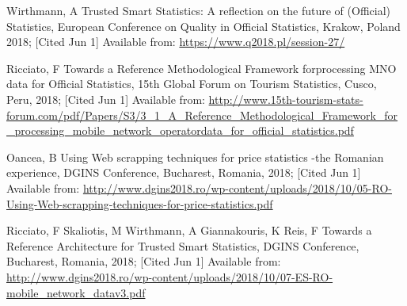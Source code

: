 \documentclass[]{article}
\begin{document}
\begin{thebibliography}{99}
Wirthmann, A Trusted Smart Statistics: A reflection on the future of (Official) Statistics, European Conference on Quality in Official Statistics, Krakow, Poland 2018; [Cited Jun 1]
Available from:
\url{https://www.q2018.pl/session-27/}

Ricciato, F Towards a Reference Methodological Framework forprocessing MNO data for Official Statistics, 15th Global Forum on Tourism Statistics, Cusco, Peru, 2018; [Cited Jun 1]
Available from:
\url{http://www.15th-tourism-stats-forum.com/pdf/Papers/S3/3_1_A_Reference_Methodological_Framework_for_processing_mobile_network_operatordata_for_official_statistics.pdf}

Oancea, B Using Web scrapping techniques for price statistics -the Romanian experience, DGINS Conference, Bucharest, Romania, 2018; [Cited Jun 1]
Available from:
\url{http://www.dgins2018.ro/wp-content/uploads/2018/10/05-RO-Using-Web-scrapping-techniques-for-price-statistics.pdf} 

Ricciato, F Skaliotis, M Wirthmann, A Giannakouris, K Reis, F Towards a Reference Architecture for Trusted Smart Statistics, DGINS Conference, Bucharest, Romania, 2018; [Cited Jun 1]
Available from:
\url{http://www.dgins2018.ro/wp-content/uploads/2018/10/07-ES-RO-mobile_network_datav3.pdf}

\end{thebibliography}
\end{document}
